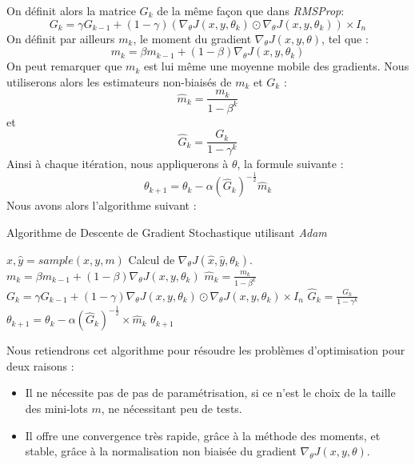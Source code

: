 \documentclass[a4paper, 11pt]{report}
\begin{document}
On définit alors la matrice $G_k$ de la même façon que dans \emph{RMSProp}:
$$G_k = \gamma G_{k-1} + (1-\gamma)(\nabla_\theta J(x,y,\theta_k)\odot\nabla_\theta J(x,y,\theta_k)) \times I_n$$
On définit par ailleurs $m_k$, le moment du gradient $\nabla_\theta J(x,y,\theta)$, tel que :
$$m_k = \beta m_{k-1} + (1-\beta) \nabla_\theta J(x,y,\theta_k) $$
On peut remarquer que $m_k$ est lui même une moyenne mobile des gradients.
Nous utiliserons alors les estimateurs non-biaisés de $m_k$ et $G_k$ :
$$\hat{m}_k = \frac{m_k}{1-\beta^k} $$
et
$$\hat{G}_k = \frac{G_k}{1-\gamma^k}$$
Ainsi à chaque itération, nous appliquerons à $\theta$, la formule suivante :
$$\theta_{k+1} = \theta_k - \alpha (\hat{G}_k)^{-\frac{1}{2}} \hat{m}_k$$
Nous avons alors l'algorithme suivant :
\begin{algorithm}[H]
	\caption{Algorithme de Descente de Gradient Stochastique utilisant \emph{Adam}}
	\begin{algorithmic}
	    \REPEAT
	    	\STATE $\hat{x},\hat{y} = sample(x,y,m)$
	    	\STATE Calcul de $\nabla_\theta J(\hat{x},\hat{y},\theta_k)$.
	    	\STATE $m_k = \beta m_{k-1} + (1-\beta) \nabla_\theta J(x,y,\theta_k)$
	    	\STATE $\hat{m}_k = \frac{m_k}{1-\beta^k} $
	    	\STATE $G_k = \gamma G_{k-1} + (1-\gamma)\nabla_\theta J(x,y,\theta_k)\odot\nabla_\theta J(x,y,\theta_k) \times I_n$
	    	\STATE $\hat{G}_k = \frac{G_k}{1-\gamma^k}$
	    	\STATE $\theta_{k+1} = \theta_k - \alpha (\hat{G}_k)^{-\frac{1}{2}} \times \hat{m}_k$
	    \RETURN $\theta_{k+1}$
	\end{algorithmic}
\end{algorithm}
Nous retiendrons cet algorithme pour résoudre les problèmes d'optimisation pour deux raisons :
\begin{itemize}
	\item Il ne nécessite pas de pas de paramétrisation, si ce n'est le choix de la taille des mini-lots $m$, ne nécessitant peu de tests.
	\item Il offre une convergence très rapide, grâce à la méthode des moments, et stable, grâce à la normalisation non biaisée du gradient $\nabla_\theta J(x,y,\theta)$.
\end{itemize}
\end{document}
